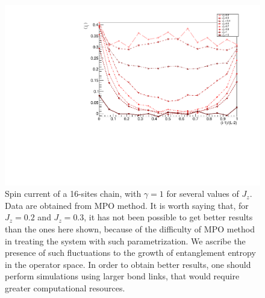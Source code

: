 


\begin{figure}[H]
    \centering
    \includegraphics[scale=0.7]{Figures/16sites/16sites_SpinCurrVaryingJz.pdf}
    \captionsetup{width=1.\linewidth}
    \caption{Spin current of a 16-sites chain, with $\gamma = 1$ for several values of $J_z$. Data are obtained from MPO method. It is worth saying that, for $J_z=0.2$ and $J_z=0.3$, it has not been possible to get better results than the ones here shown, because of the difficulty of MPO method in treating the system with such parametrization. We ascribe the presence of such fluctuations to the growth of entanglement entropy in the operator space. In order to obtain better results, one should perform simulations using larger bond links, that would require greater computational resources.}
    \label{fig:16sites_SpinCurrVaryingJz}
\end{figure}

